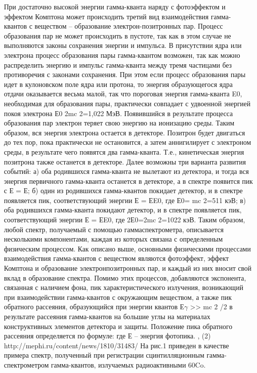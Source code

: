 При достаточно высокой энергии гамма-кванта наряду с фотоэффектом и эффектом
Комптона может происходить третий вид взаимодействия гамма-квантов с веществом –
образование электрон-позитронных пар. Процесс образования пар не может
происходить в пустоте, так как в этом случае не выполняются законы сохранения
энергии и импульса. В присутствии ядра или электрона процесс образования пары
гамма-квантом возможен, так как можно распределить энергию и импульс
гамма-кванта между тремя частицами без противоречия с законами сохранения. При
этом если процесс образования пары идет в кулоновском поле ядра или протона, то
энергия образующегося ядра отдачи оказывается весьма малой, так что пороговая
энергия гамма-кванта E0, необходимая для образования пары, практически совпадает
с удвоенной энергией покоя электрона Е0  2mc 2=1,022 МэВ. Появившийся в
результате процесса образования пар электрон теряет свою энергию на ионизацию
среды. Таким образом, вся энергия электрона остается в детекторе. Позитрон будет
двигаться до тех пор, пока практически не остановится, а затем аннигилирует с
электроном среды, в результате чего появятся два гамма-кванта. Т.е.,
кинетическая энергия позитрона также останется в детекторе. Далее возможны три
варианта развития событий: а) оба родившихся гамма-кванта не вылетают из
детектора, и тогда вся энергия первичного гамма-кванта останется в детекторе, а
в спектре появится пик с Е = Е; б) один из родившихся гамма-квантов покидает
детектор, и в спектре появляется пик, соответствующий энергии Е = ЕE0, где
Е0= mc 2=511 кэВ; в) оба родившихся гамма-кванта покидают детектор, и в спектре
появляется пик, соответствующий энергии Е = ЕE0, где 2Е0=2mc 2=1022 кэВ.
Таким образом, любой спектр, получаемый с помощью гаммаспектрометра, описывается
несколькими компонентами, каждая из которых связана с определенным физическим
процессом. Как описано выше, основными физическими процессами взаимодействия
гамма-квантов с веществом являются фотоэффект, эффект Комптона и образование
электронпозитронных пар, и каждый из них вносит свой вклад в образование
спектра. Помимо этих процессов, добавляются экспонента, связанная с наличием
фона, пик характеристического излучения, возникающий при взаимодействии
гамма-квантов с окружающим веществом, а также пик обратного рассеяния,
образующийся при энергии квантов Е$\gamma$ >> mc 2 /2 в результате рассеяния
гамма-квантов на большие углы на материалах конструктивных элементов детектора и
защиты. Положение пика обратного рассеяния определяется по формуле: где Е –
энергия фотопика.  , (2) http://mephi.ru/content/news/1810/31483/ На рис.1
приведен в качестве примера спектр, полученный при регистрации сцинтилляционным
гамма-спектрометром гамма-квантов, излучаемых радиоактивными 60Co.

